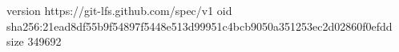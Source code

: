 version https://git-lfs.github.com/spec/v1
oid sha256:21ead8df55b9f54897f5448e513d99951c4bcb9050a351253ec2d02860f0efdd
size 349692
